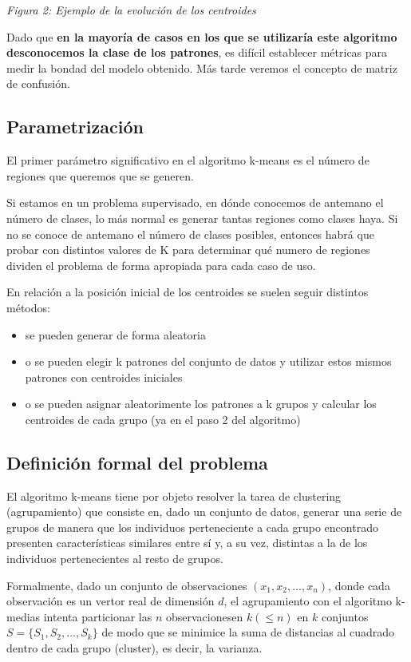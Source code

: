\documentclass[11pt]{article}
\providecommand{\tightlist}{%
      \setlength{\itemsep}{0pt}\setlength{\parskip}{0pt}}
\begin{document}
\emph{Figura 2: Ejemplo de la evolución de los centroides}

Dado que \textbf{en la mayoría de casos en los que se utilizaría este
algoritmo desconocemos la clase de los patrones}, es difícil establecer
métricas para medir la bondad del modelo obtenido. Más tarde veremos el
concepto de matriz de confusión.

\subsection{Parametrización}\label{parametrizaciuxf3n}

El primer parámetro significativo en el algoritmo k-means es el número
de regiones que queremos que se generen.

Si estamos en un problema supervisado, en dónde conocemos de antemano el
número de clases, lo más normal es generar tantas regiones como clases
haya. Si no se conoce de antemano el número de clases posibles, entonces
habrá que probar con distintos valores de K para determinar qué numero
de regiones dividen el problema de forma apropiada para cada caso de
uso.

En relación a la posición inicial de los centroides se suelen seguir
distintos métodos:

\begin{itemize}
\tightlist
\item
  se pueden generar de forma aleatoria
\item
  o se pueden elegir k patrones del conjunto de datos y utilizar estos
  mismos patrones con centroides iniciales
\item
  o se pueden asignar aleatorimente los patrones a k grupos y calcular
  los centroides de cada grupo (ya en el paso 2 del algoritmo)
\end{itemize}

\subsection{Definición formal del
problema}\label{definiciuxf3n-formal-del-problema}

El algoritmo k-means tiene por objeto resolver la tarea de clustering
(agrupamiento) que consiste en, dado un conjunto de datos, generar una
serie de grupos de manera que los individuos perteneciente a cada grupo
encontrado presenten características similares entre sí y, a su vez,
distintas a la de los individuos pertenecientes al resto de grupos.

Formalmente, dado un conjunto de observaciones \((x_1, x_2, ..., x_n)\),
donde cada observación es un vertor real de dimensión \(d\), el
agrupamiento con el algoritmo k-medias intenta particionar las \(n\)
observacionesen \(k (\le n)\) en \(k\) conjuntos
\(S = \{S_1, S_2, ..., S_k\}\) de modo que se minimice la suma de
distancias al cuadrado dentro de cada grupo (cluster), es decir, la
varianza.
\end{document}
